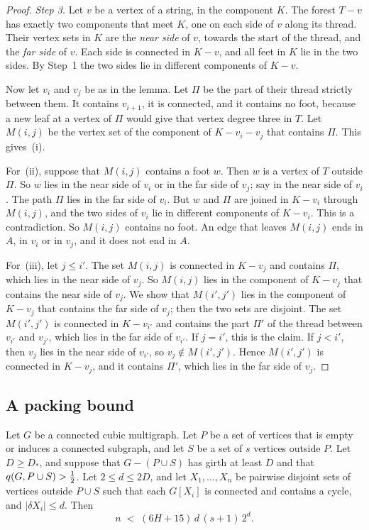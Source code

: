 \begin{proof}
\emph{Step 3.} Let $v$ be a vertex of a string, in the component $K$. The forest $T-v$ has exactly
two components that meet $K$, one on each side of $v$ along its thread. Their vertex sets in $K$ are
the \emph{near side} of $v$, towards the start of the thread, and the \emph{far side} of $v$. Each
side is connected in $K-v$, and all feet in $K$ lie in the two sides. By Step~1 the two sides lie in
different components of $K-v$.

Now let $v_i$ and $v_j$ be as in the lemma. Let $\Pi$ be the part of their thread strictly between
them. It contains $v_{i+1}$, it is connected, and it contains no foot, because a new leaf at a
vertex of $\Pi$ would give that vertex degree three in $T$. Let $M(i,j)$ be the vertex set of the
component of $K-v_i-v_j$ that contains $\Pi$. This gives~(i).

For~(ii), suppose that $M(i,j)$ contains a foot $w$. Then $w$ is a vertex of $T$ outside $\Pi$. So
$w$ lies in the near side of $v_i$ or in the far side of $v_j$; say in the near side of $v_i$. The
path $\Pi$ lies in the far side of $v_i$. But $w$ and $\Pi$ are joined in $K-v_i$ through
$M(i,j)$, and the two sides of $v_i$ lie in different components of $K-v_i$. This is a
contradiction. So $M(i,j)$ contains no foot. An edge that leaves $M(i,j)$ ends in $A$, in $v_i$ or
in $v_j$, and it does not end in $A$.

For~(iii), let $j\le i'$. The set $M(i,j)$ is connected in $K-v_j$ and contains $\Pi$, which lies
in the near side of $v_j$. So $M(i,j)$ lies in the component of $K-v_j$ that contains the near side
of $v_j$. We show that $M(i',j')$ lies in the component of $K-v_j$ that contains the far side of
$v_j$; then the two sets are disjoint. The set $M(i',j')$ is connected in $K-v_{i'}$ and contains
the part $\Pi'$ of the thread between $v_{i'}$ and $v_{j'}$, which lies in the far side of
$v_{i'}$. If $j=i'$, this is the claim. If $j<i'$, then $v_j$ lies in the near side of $v_{i'}$, so
$v_j\notin M(i',j')$. Hence $M(i',j')$ is connected in $K-v_j$, and it contains $\Pi'$, which lies
in the far side of $v_j$.
\end{proof}

\subsection{A packing bound}

\begin{proposition}[Packing]\label{prop:packing}
Let $G$ be a connected cubic multigraph. Let $P$ be a set of vertices that is empty or induces a
connected subgraph, and let $S$ be a set of $s$ vertices outside $P$. Let $D\ge D_{*}$, and suppose
that $G-(P\cup S)$ has girth at least $D$ and that $q(G,P\cup S)>\tfrac12$. Let $2\le d\le2D$, and let
$X_1,\dots,X_n$ be pairwise disjoint sets of vertices outside $P\cup S$ such that each $G[X_i]$ is
connected and contains a cycle, and $|\delta X_i|\le d$. Then
\[
  n\;<\;(6H+15)\,d\,(s+1)\,2^{d}.
\]
\end{proposition}


